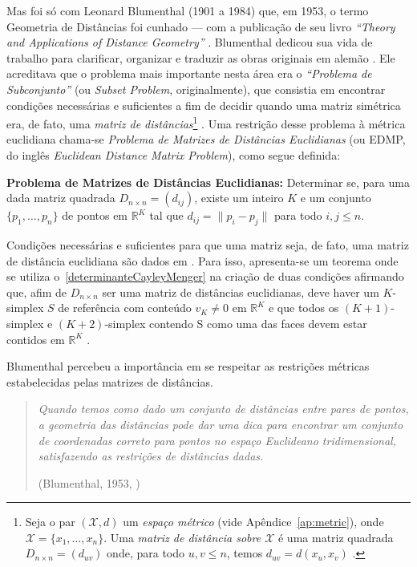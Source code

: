 \documentclass[a4paper,12pt]{article}
\begin{document}
Mas foi só com Leonard Blumenthal (1901 a 1984) que, em 1953, o termo Geometria de Distâncias foi cunhado --- com a publicação de seu livro \textit{``Theory and Applications of Distance Geometry''} \cite{Blumenthal:53}.
Blumenthal dedicou sua vida de trabalho para clarificar, organizar e traduzir as obras originais em alemão \cite{libertiEDG}. Ele acreditava que o problema mais importante nesta área era o \textit{``Problema de Subconjunto''} (ou \textit{Subset Problem}, originalmente), que consistia em encontrar condições necessárias e suficientes a fim de decidir quando uma matriz simétrica era, de fato, uma \textit{matriz de distâncias}\footnote{Seja o par $(\mathcal{X}, d)$ um \textit{espaço métrico} (vide Apêndice~\ref{ap:metric}), onde $\mathcal{X} = \{x_1, \dots, x_n\}$. Uma \textit{matriz de distância sobre $\mathcal{X}$} é uma matriz quadrada $D_{n\times n} = (d_{uv})$ onde, para todo $u,v \leq n$, temos $d_{uv} = d(x_u,x_v)$ \cite{carlileGDandAplications}.} \cite{carlileGDandAplications}. Uma restrição desse problema à métrica euclidiana chama-se \textit{Problema de Matrizes de Distâncias Euclidianas} (ou EDMP, do inglês \textit{Euclidean Distance Matrix Problem}), como segue definida:

\begin{center}
	\begin{minipage}{0.9 \linewidth}
		\label{EDMP}
		\textbf{Problema de Matrizes de Distâncias Euclidianas:} Determinar se, para uma dada matriz quadrada $D_{n\times n} = (d_{ij})$, existe um inteiro $K$ e um conjunto $\{p_1, \dots, p_n \}$ de pontos em $\mathbb{R}^K$ tal que $d_{ij} = \lVert p_i - p_j\rVert$ para todo $i,j \leq n$.
	\end{minipage}
\end{center} 

Condições necessárias e suficientes para que uma matriz seja, de fato, uma matriz de distância euclidiana são dados em \cite{EDMPResolucao}. Para isso, apresenta-se um teorema onde se utiliza o~\ref{determinanteCayleyMenger} na criação de duas condições afirmando que, afim de $D_{n\times n}$ ser uma matriz de distâncias euclidianas, deve haver um $K$-simplex $S$ de referência com conteúdo $v_K \neq 0$ em $\mathbb{R}^K$ e que todos os $(K+1)$-simplex e $(K+2)$-simplex contendo S como uma das faces devem estar contidos em $\mathbb{R}^K$ \cite{carlileGDandAplications}.

Blumenthal percebeu a importância em se respeitar as restrições métricas estabelecidas pelas matrizes de distâncias.
\begin{quotation}
	\textit{Quando temos como dado um conjunto de distâncias entre pares de pontos, a geometria das distâncias pode dar uma dica para encontrar um conjunto de coordenadas correto para pontos no espaço Euclideano tridimensional, satisfazendo as restrições de distâncias dadas.}
	\begin{flushright}
		(Blumenthal, 1953, \cite{Blumenthal:53})
	\end{flushright}
\end{quotation}
\end{document}
